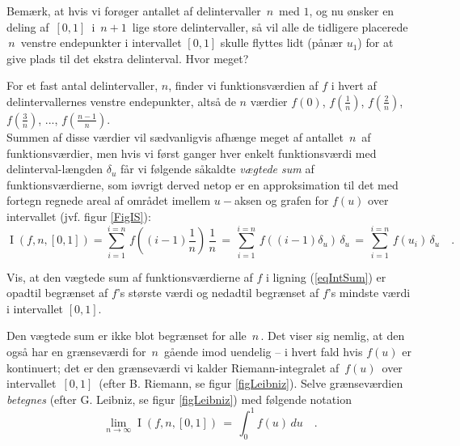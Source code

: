 \begin{exercise}
Bemærk, at hvis vi forøger antallet af delintervaller $\,n\,$ med
$1$, og nu ønsker en deling af $\,[0, 1]\,$ i $\, n+1 \, $ lige
store delintervaller, så vil alle de tidligere placerede $\,n\,$
venstre endepunkter i intervallet $[0, 1]$ skulle flyttes lidt
(pånær $u_{1}$) for at give plads til det ekstra delinterval. Hvor
meget?
\end{exercise}

For et fast antal delintervaller, $n$, finder vi
funktionsværdien af $f$ i hvert af
delintervallernes venstre endepunkter, altså de
$n$ værdier $f(0)$, $f(\frac{1}{n})$,
$f(\frac{2}{n})$, $f(\frac{3}{n})$, ...,
$f(\frac{n-1}{n})$.\\

Summen af disse værdier vil sædvanligvis afhænge meget af antallet
$\,n\,$ af funktionsværdier, men hvis vi først ganger hver enkelt
funktionsværdi med delinterval-længden  $\delta_{u}$ får vi følgende såkaldte  \emph{vægtede sum} af
funk\-tions\-vær\-di\-er\-ne, som iøvrigt derved netop er en approksimation til det med fortegn
regnede areal af området imellem $u-$aksen og grafen for $f(u)$ over intervallet (jvf. figur \ref{FigIS}):
\begin{equation} \label{eqIntSum}
\operatorname{I}(f, n, [0,1]) = \sum_{i=1}^{i=n}\,
f\left((i-1)\frac{1}{n}\right)\,\frac{1}{n} \, = \,
\sum_{i=1}^{i=n}\, f\left((i-1)\delta_{u}\right)\,\delta_{u} \, = \,
\sum_{i=1}^{i=n}\, f\left(u_{i}\right)\,\delta_{u} \quad .
\end{equation}



\begin{exercise}
Vis, at den vægtede sum af funktionsværdierne af $f$ i ligning
(\ref{eqIntSum}) er opadtil begrænset  af $f$'s største værdi og nedadtil begrænset af $f$'s
mindste værdi i intervallet $[0,1]$.
\end{exercise}

Den vægtede sum er ikke blot begrænset for alle
$\,n\,$. Det viser sig nemlig, at den også har en grænseværdi for $\,n\,$
gående imod  uendelig -- i hvert fald hvis $f(u)$ er kontinuert; det er den grænseværdi vi
kalder Riemann-integralet af $\,f(u)\,$ over intervallet
$\,[0,1]\,$ (efter B. Riemann, se figur \ref{figLeibniz}).
Selve grænseværdien {\emph{betegnes}} (efter G. Leibniz, se figur \ref{figLeibniz}) med følgende notation
\begin{equation} \label{eqRiemannSum}
\lim_{n \to \infty} \operatorname{I}(f,n, [0, 1]) \, = \, \int_{0}^{1} f(u)\, du \quad .
\end{equation}



